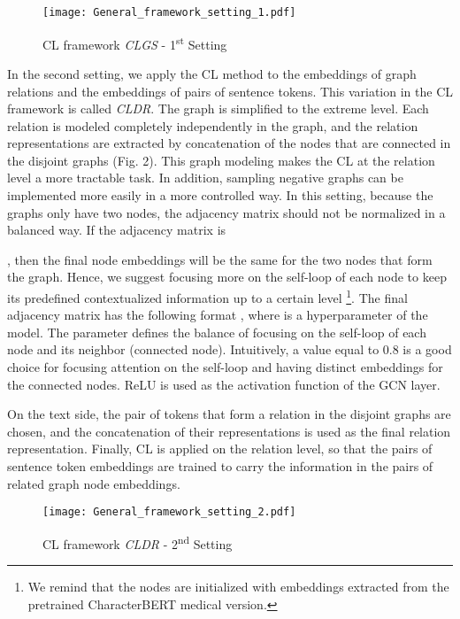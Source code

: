 \documentclass[11pt]{article}
\begin{document}
\vspace{-1mm}
\begin{figure}[!h]
  \centering
  \texttt{[image: General\_framework\_setting\_1.pdf]}
  \vspace{-1ex}
  \caption{CL framework \textit{CLGS} - 1\textsuperscript{st} Setting}
\end{figure}
\vspace{-2mm}

In the second setting, we apply the CL method to the embeddings of graph relations and the embeddings of pairs of sentence tokens.  This variation in the CL framework is called \textit{CLDR}.  The graph is simplified to the extreme level.  Each relation is modeled completely independently in the graph, and the relation representations are extracted by concatenation of the nodes that are connected in the disjoint graphs (Fig. 2). This graph modeling makes the CL at the relation level a more tractable task. In addition, sampling negative graphs can be implemented more easily in a more controlled way. In this setting, because the graphs only have two nodes, the adjacency matrix should not be normalized in a balanced way. If the adjacency matrix is

, then the final node embeddings will be the same for the two nodes that form the graph. Hence, we suggest focusing more on the self-loop of each node to keep its predefined contextualized information up to a certain level \footnote{We remind that the nodes are initialized with embeddings extracted from the pretrained CharacterBERT medical version.}. The final adjacency matrix has the following format
, where  is a hyperparameter of the model. The  parameter defines the balance of focusing on the self-loop of each node and its neighbor (connected node). Intuitively, a  value equal to 0.8 is a good choice for focusing attention on the self-loop and having distinct embeddings for the connected nodes. ReLU is used as the activation function of the GCN layer. 

On the text side, the pair of tokens that form a relation in the disjoint graphs are chosen, and the concatenation of their representations is used as the final relation representation. Finally, CL is applied on the relation level, so that the pairs of sentence token embeddings are trained to carry the information in the pairs of related graph node embeddings.

\begin{figure}[!h]
  \centering
  \texttt{[image: General\_framework\_setting\_2.pdf]}
  \vspace{-1ex}
  \caption{CL framework \textit{CLDR} - 2\textsuperscript{nd} Setting}
\end{figure}
\vspace{-2mm}
\end{document}
